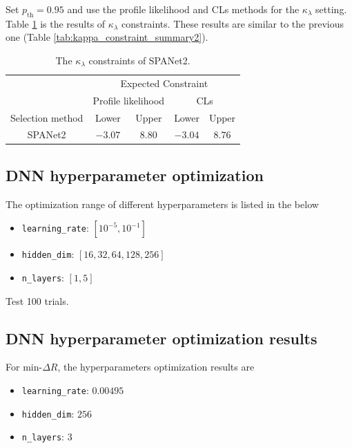 \documentclass[12pt]{article}
\begin{document}
	Set $p_\text{th} = 0.95$ and use the profile likelihood and CLs methods for the $\kappa_\lambda$ setting. Table \ref{tab:kappa_constraint_SPANet_best_hp} is the results of $\kappa_\lambda$ constraints. These results are similar to the previous one (Table \ref{tab:kappa_constraint_summary2}).
	\begin{table}[htpb]
		\centering
		\caption{The $\kappa_\lambda$ constraints of SPANet2.}
		\label{tab:kappa_constraint_SPANet_best_hp}
		\begin{tabular}{c|cc|cc}
							  & \multicolumn{4}{c}{Expected Constraint}                          \\
							  & \multicolumn{2}{c}{Profile likelihood} & \multicolumn{2}{c}{CLs} \\ \hline
		Selection method      & Lower              & Upper             & Lower      & Upper      \\ \hline
		SPANet2      & $-3.07$            & $8.80$             & $-3.04$      & $8.76$      \\
		\end{tabular}
	\end{table}

	\subsection{DNN hyperparameter optimization}%
	\label{sub:dnn_hyperparameter_optimization}
		The optimization range of different hyperparameters is listed in the below
		\begin{itemize}
			\item \verb+learning_rate+: $[10^{-5}, 10^{-1}]$ 
			\item \verb+hidden_dim+: $[16,32,64,128,256]$ 
			\item \verb+n_layers+: $[1,5]$ 
		\end{itemize}
		Test 100 trials.
	\subsection{DNN hyperparameter optimization results}%
	\label{sub:dnn_hyperparameter_optimization_results}
		For $\text{min-}\Delta R$, the hyperparameters optimization results are 
		\begin{itemize}
			\item \verb+learning_rate+: $0.00495$ 
			\item \verb+hidden_dim+: $256$ 
			\item \verb+n_layers+: $3$ 
		\end{itemize}
		
\end{document}
